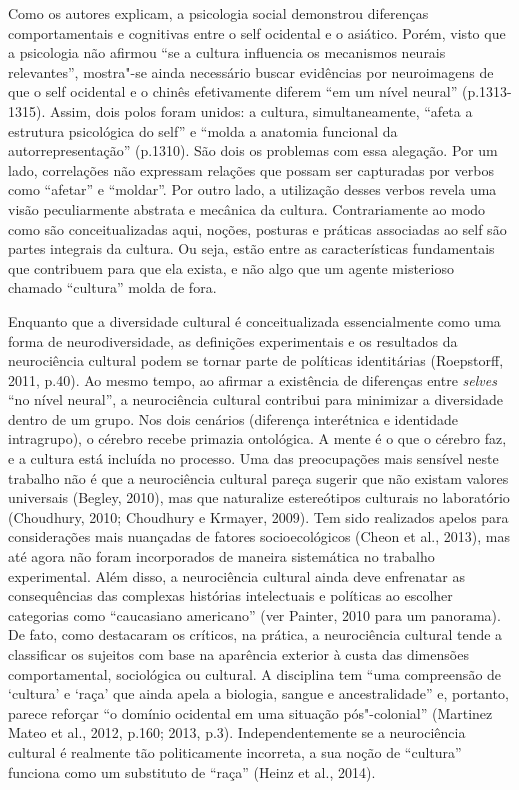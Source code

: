 Como os autores explicam, a psicologia social demonstrou diferenças
comportamentais e cognitivas entre o self ocidental e o asiático. Porém,
visto que a psicologia não afirmou ``se a cultura influencia os
mecanismos neurais relevantes'', mostra"-se ainda necessário buscar
evidências por neuroimagens de que o self ocidental e o chinês
efetivamente diferem ``em um nível neural'' (p.1313-1315). Assim, dois
polos foram unidos: a cultura, simultaneamente, ``afeta a estrutura
psicológica do self'' e ``molda a anatomia funcional da
autorrepresentação'' (p.1310). São dois os problemas com essa alegação.
Por um lado, correlações não expressam relações que possam ser
capturadas por verbos como ``afetar'' e ``moldar''. Por outro lado, a
utilização desses verbos revela uma visão peculiarmente abstrata e
mecânica da cultura. Contrariamente ao modo como são conceitualizadas
aqui, noções, posturas e práticas associadas ao self são partes
integrais da cultura. Ou seja, estão entre as características
fundamentais que contribuem para que ela exista, e não algo que um
agente misterioso chamado ``cultura'' molda de fora.

Enquanto que a diversidade cultural é conceitualizada essencialmente
como uma forma de neurodiversidade, as definições experimentais e os
resultados da neurociência cultural podem se tornar parte de políticas
identitárias (Roepstorff, 2011, p.40). Ao mesmo tempo, ao afirmar a
existência de diferenças entre \emph{selves} ``no nível neural'', a
neurociência cultural contribui para minimizar a diversidade dentro de
um grupo. Nos dois cenários (diferença interétnica e identidade
intragrupo), o cérebro recebe primazia ontológica. A mente é o que o
cérebro faz, e a cultura está incluída no processo. Uma das preocupações
mais sensível neste trabalho não é que a neurociência cultural pareça
sugerir que não existam valores universais (Begley, 2010), mas que
naturalize estereótipos culturais no laboratório (Choudhury, 2010;
Choudhury e Krmayer, 2009). Tem sido realizados apelos para
considerações mais nuançadas de fatores socioecológicos (Cheon et al.,
2013), mas até agora não foram incorporados de maneira sistemática no
trabalho experimental. Além disso, a neurociência cultural ainda deve
enfrenatar as consequências das complexas histórias intelectuais e
políticas ao escolher categorias como ``caucasiano americano'' (ver
Painter, 2010 para um panorama). De fato, como destacaram os críticos,
na prática, a neurociência cultural tende a classificar os sujeitos com
base na aparência exterior à custa das dimensões comportamental,
sociológica ou cultural. A disciplina tem ``uma compreensão de `cultura'
e `raça' que ainda apela a biologia, sangue e ancestralidade'' e,
portanto, parece reforçar ``o domínio ocidental em uma situação
pós"-colonial'' (Martinez Mateo et al., 2012, p.160; 2013, p.3).
Independentemente se a neurociência cultural é realmente tão
politicamente incorreta, a sua noção de ``cultura'' funciona como um
substituto de ``raça'' (Heinz et al., 2014).

